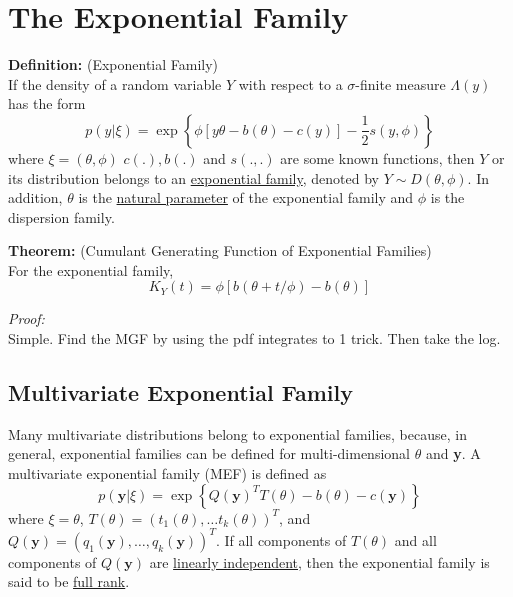 \documentclass[12pt]{article}
\numberwithin{equation}{section}
\begin{document}
\section{The Exponential Family}
\textbf{Definition:} (Exponential Family) \\
If the density of a random variable $Y$ with respect to a $\sigma$-finite measure $\Lambda(y)$ has the form
\begin{equation*}
  p(y | \xi) = \exp 
  \left\{
    \phi[y\theta - b(\theta) - c(y)] - \frac{1}{2} s(y, \phi)
  \right\}
\end{equation*}
where $\xi = (\theta, \phi)$ $c(.), b(.)$ and $s(., .)$ are some known functions, then $Y$ or its distribution belongs to an \underline{exponential family}, denoted by $Y \sim D(\theta, \phi)$. In addition, $\theta$ is the \underline{natural parameter} of the exponential family and $\phi$ is the dispersion family.

\textbf{Theorem:} (Cumulant Generating Function of Exponential Families) \\
For the exponential family,
\begin{equation*}
  K_Y(t) = \phi[b(\theta + t/\phi) - b(\theta)]
\end{equation*}

\textit{Proof:} \\
Simple. Find the MGF by using the pdf integrates to 1 trick. Then take the log.

\subsection{Multivariate Exponential Family}
Many multivariate distributions belong to exponential families,
because, in general, exponential families can be defined for
multi-dimensional $\theta$ and \textbf{y}. A multivariate exponential family (MEF) is defined as
\begin{equation*}
  p(\mathbf{y} | \xi) = \exp 
  \left\{
    Q(\mathbf{y})^T T(\theta) - b(\theta) - c(\mathbf{y})
  \right\}
\end{equation*}
where $\xi = \theta$, $T(\theta) = (t_1(\theta), \ldots t_k(\theta))^T$, and 
$Q(\mathbf{y}) = (q_1(\mathbf{y}), \ldots, q_k(\mathbf{y}))^T$. If all components of $T(\theta)$ and all components of $Q(\mathbf{y})$ are \underline{linearly independent}, then the exponential family is said to be \underline{full rank}. 
\end{document}
